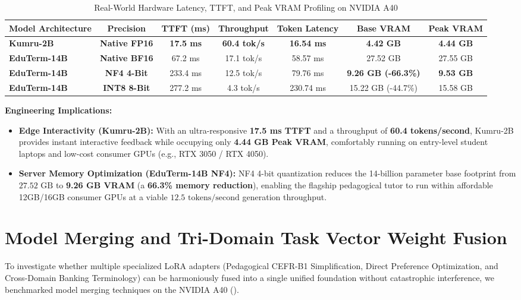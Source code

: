 \documentclass[a4paper,12pt]{report}
\begin{document}
\begin{table}[htbp]
\centering
\small
\caption{Real-World Hardware Latency, TTFT, and Peak VRAM Profiling on NVIDIA A40}
\label{tab:quantization_benchmark}
\scriptsize\setlength{\tabcolsep}{1.5pt}
\begin{tabularx}{\textwidth}{>{\RaggedRight\arraybackslash}Xcccccc}
\hline
\textbf{Model Architecture} & \textbf{Precision} & \textbf{TTFT (ms)} & \textbf{Throughput} & \textbf{Token Latency} & \textbf{Base VRAM} & \textbf{Peak VRAM} \\
\hline
\textbf{Kumru-2B} & \textbf{Native FP16} & \textbf{17.5 ms} & \textbf{60.4 tok/s} & \textbf{16.54 ms} & \textbf{4.42 GB} & \textbf{4.44 GB} \\
\textbf{EduTerm-14B} & \textbf{Native BF16} & 67.2 ms & 17.1 tok/s & 58.57 ms & 27.52 GB & 27.55 GB \\
\textbf{EduTerm-14B} & \textbf{NF4 4-Bit} & 233.4 ms & 12.5 tok/s & 79.76 ms & \textbf{9.26 GB (-66.3\%)} & \textbf{9.53 GB} \\
\textbf{EduTerm-14B} & \textbf{INT8 8-Bit} & 277.2 ms & 4.3 tok/s & 230.74 ms & 15.22 GB (-44.7\%) & 15.58 GB \\
\hline
\end{tabularx}
\end{table}

\textbf{Engineering Implications:} 
\begin{itemize}
    \item \textbf{Edge Interactivity (Kumru-2B):} With an ultra-responsive \textbf{17.5 ms TTFT} and a throughput of \textbf{60.4 tokens/second}, Kumru-2B provides instant interactive feedback while occupying only \textbf{4.44 GB Peak VRAM}, comfortably running on entry-level student laptops and low-cost consumer GPUs (e.g., RTX 3050 / RTX 4050).
    \item \textbf{Server Memory Optimization (EduTerm-14B NF4):} NF4 4-bit quantization reduces the 14-billion parameter base footprint from $27.52\text{ GB}$ to \textbf{9.26 GB VRAM} (a \textbf{66.3\% memory reduction}), enabling the flagship pedagogical tutor to run within affordable 12GB/16GB consumer GPUs at a viable $12.5\text{ tokens/second}$ generation throughput.
\end{itemize}

\section{Model Merging and Tri-Domain Task Vector Weight Fusion}
\label{sec:model_merging}
To investigate whether multiple specialized LoRA adapters (Pedagogical CEFR-B1 Simplification, Direct Preference Optimization, and Cross-Domain Banking Terminology) can be harmoniously fused into a single unified foundation without catastrophic interference, we benchmarked model merging techniques on the NVIDIA A40 (). 
\end{document}
